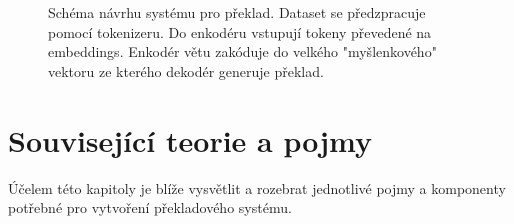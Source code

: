 \begin{figure}[H]
    \begin{center}
    \end{center}
	\caption{Schéma návrhu systému pro překlad. Dataset se předzpracuje pomocí tokenizeru. Do enkodéru vstupují tokeny převedené na embeddings. Enkodér větu zakóduje do velkého "myšlenkového" vektoru ze kterého dekodér generuje překlad.}
	\label{img:draft}
\end{figure}


\chapter{Související teorie a pojmy}\label{chapter:theory}
Účelem této kapitoly je blíže vysvětlit a rozebrat jednotlivé pojmy a komponenty potřebné pro vytvoření překladového systému.



